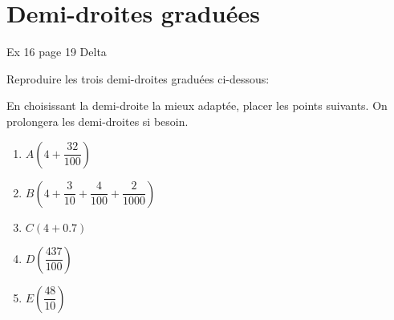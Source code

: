 \section{Demi-droites graduées}

Ex 16 page 19 Delta

\begin{questions}
	\question Reproduire les trois demi-droites graduées ci-dessous:
	
	\question En choisissant la demi-droite la mieux adaptée, placer les points suivants. On prolongera les demi-droites si besoin.
	
	\begin{multicols}{2}
		\begin{enumerate}
			\item $A\left( 4 + \dfrac{32}{100}\right)$
			\item $B\left(4 + \dfrac{3}{10} + \dfrac{4}{100} + \dfrac{2}{\num{1000}}\right)$
			\item $C(4 + \num{0.7})$
			\item $D\left(\dfrac{437}{100}\right)$
			\item $E\left(\dfrac{48}{10}\right)$
		\end{enumerate}
	\end{multicols}
\end{questions}